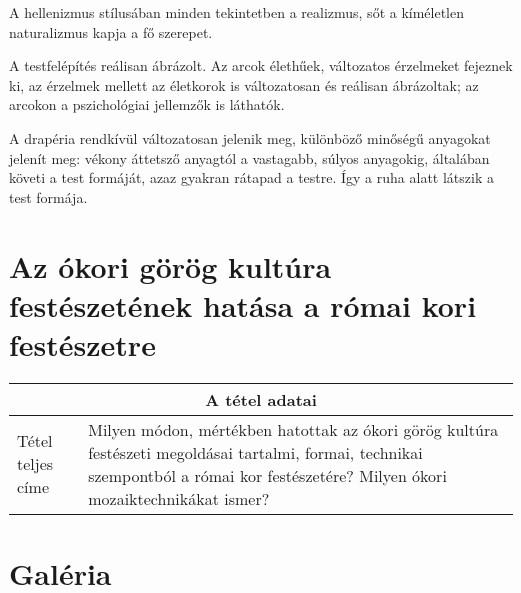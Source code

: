 	A hellenizmus stílusában minden tekintetben a realizmus, sőt a kíméletlen naturalizmus kapja a fő szerepet.	
	
	A testfelépítés reálisan ábrázolt. Az arcok élethűek, változatos érzelmeket fejeznek ki, az érzelmek mellett az életkorok is változatosan és reálisan ábrázoltak; az arcokon a pszichológiai jellemzők is láthatók.
	
	A drapéria rendkívül változatosan jelenik meg, különböző minőségű anyagokat jelenít meg: vékony áttetsző anyagtól a vastagabb, súlyos anyagokig, általában követi a test formáját, azaz gyakran rátapad a testre. Így a ruha alatt látszik a test formája.

\cleardoublepage

\section{Az ókori görög kultúra festészetének hatása a római kori festészetre}

\begin{center}
	\begin{longtable}{ | p{} | p{} | }
		
		\hline
		\multicolumn{2}{|c|}{\textbf{A tétel adatai}}
		\\ \hline
		
		\hline
		Tétel teljes címe &
		Milyen módon, mértékben hatottak az ókori görög kultúra festészeti megoldásai tartalmi, formai, technikai szempontból a római kor festészetére? Milyen ókori mozaiktechnikákat ismer?
		\\ \hline
		
	\end{longtable}
\end{center}

\clearpage

\section{Galéria}
